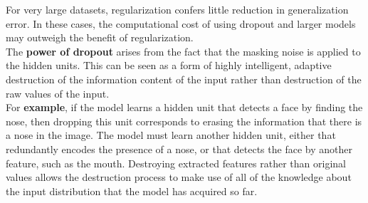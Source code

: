 \begin{multicols}{2}
	For very large datasets, regularization confers little reduction in generalization error.
	In these cases, the computational cost of using dropout and larger models may outweigh the benefit of regularization.\\

	The \textbf{power of dropout} arises from the fact that the masking noise is applied to the hidden units.
	This can be seen as a form of highly intelligent, adaptive destruction of the information content of the input rather than destruction of the raw values of the input.\\
	For \textbf{example}, if the model learns a hidden unit that detects a face by finding the nose, then dropping this unit corresponds to erasing the information that there is a nose in the image.
	The model must learn another hidden unit, either that redundantly encodes the presence of a nose, or that detects the face by another feature, such as the mouth.
	Destroying extracted features rather than original values allows the destruction process to make use of all of the knowledge about the input distribution that the model has acquired so far.


\end{multicols}
